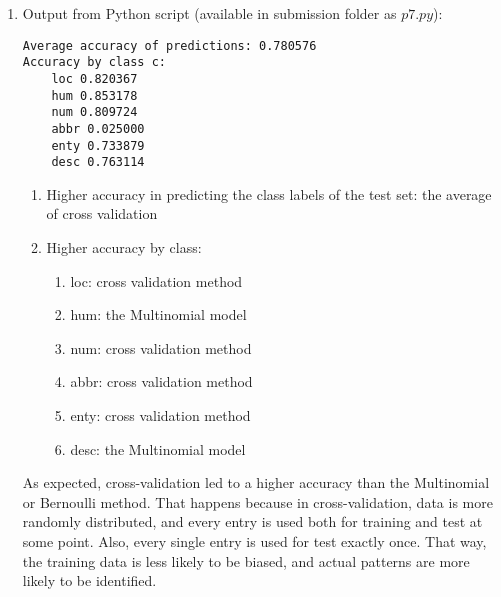 \documentclass[11pt]{article}
\begin{document}
\begin {enumerate}
\begin{verbatim}
Accuracy of prediction: 0.774790
Accuracy by class c:
    loc 0.870588
    hum 0.823529
    num 0.850000
    abbr 0.000000
    enty 0.654930
    desc 0.804348

Accuracy of prediction: 0.766387
Accuracy by class c:
    loc 0.804348
    hum 0.830769
    num 0.777778
    abbr 0.000000
    enty 0.740741
    desc 0.737589

Accuracy of prediction: 0.806723
Accuracy by class c:
    loc 0.759036
    hum 0.904762
    num 0.833333
    abbr 0.000000
    enty 0.810811
    desc 0.760684

Accuracy of prediction: 0.764706
Accuracy by class c:
    loc 0.811111
    hum 0.830645
    num 0.798246
    abbr 0.000000
    enty 0.700000
    desc 0.751938

Accuracy of prediction: 0.776471
Accuracy by class c:
    loc 0.797753
    hum 0.875000
    num 0.816514
    abbr 0.000000
    enty 0.719298
    desc 0.748148

Accuracy of prediction: 0.783193
Accuracy by class c:
    loc 0.816327
    hum 0.847826
    num 0.865979
    abbr 0.000000
    enty 0.693431
    desc 0.782609

Accuracy of prediction: 0.756303
Accuracy by class c:
    loc 0.822222
    hum 0.801587
    num 0.812500
    abbr 0.125000
    enty 0.730263
    desc 0.705036
\end{verbatim}

\item
Output from Python script (available in submission folder as $p7.py$):
\begin{verbatim}
Average accuracy of predictions: 0.780576
Accuracy by class c:
    loc 0.820367
    hum 0.853178
    num 0.809724
    abbr 0.025000
    enty 0.733879
    desc 0.763114
\end{verbatim}

\begin{enumerate}
\item
Higher accuracy in predicting the class labels of the test set: the average of cross validation
\item
Higher accuracy by class:
\begin{enumerate}
\item
loc: cross validation method
\item
hum: the Multinomial model
\item
num: cross validation method
\item
abbr: cross validation method
\item
enty: cross validation method
\item
desc: the Multinomial model
\end{enumerate}
\end{enumerate}

As expected, cross-validation led to a higher accuracy than the Multinomial or Bernoulli method. That happens because in cross-validation, data is more randomly distributed, and every entry is used both for training and test at some point. Also, every single entry is used for test exactly once. That way, the training data is less likely to be biased, and actual patterns are more likely to be identified.

\end{enumerate}
\end{document}
